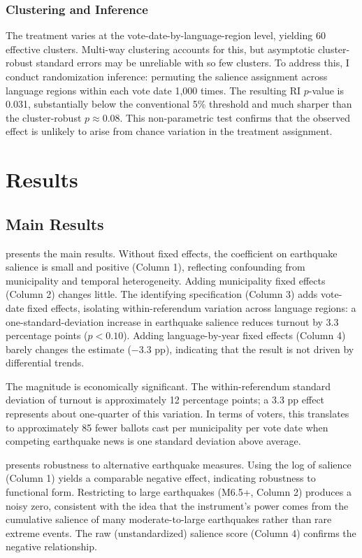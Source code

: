 \documentclass[12pt]{article}
\begin{document}
\subsubsection*{Clustering and Inference} The treatment varies at the vote-date-by-language-region level, yielding 60 effective clusters. Multi-way clustering accounts for this, but asymptotic cluster-robust standard errors may be unreliable with so few clusters. To address this, I conduct randomization inference: permuting the salience assignment across language regions within each vote date 1,000 times. The resulting RI $p$-value is 0.031, substantially below the conventional 5\% threshold and much sharper than the cluster-robust $p \approx 0.08$. This non-parametric test confirms that the observed effect is unlikely to arise from chance variation in the treatment assignment.

\section{Results}

\subsection{Main Results}

 presents the main results. Without fixed effects, the coefficient on earthquake salience is small and positive (Column 1), reflecting confounding from municipality and temporal heterogeneity. Adding municipality fixed effects (Column 2) changes little. The identifying specification (Column 3) adds vote-date fixed effects, isolating within-referendum variation across language regions: a one-standard-deviation increase in earthquake salience reduces turnout by 3.3 percentage points ($p < 0.10$). Adding language-by-year fixed effects (Column 4) barely changes the estimate ($-3.3$ pp), indicating that the result is not driven by differential trends.

The magnitude is economically significant. The within-referendum standard deviation of turnout is approximately 12 percentage points; a 3.3 pp effect represents about one-quarter of this variation. In terms of voters, this translates to approximately 85 fewer ballots cast per municipality per vote date when competing earthquake news is one standard deviation above average.

{\small}

 presents robustness to alternative earthquake measures. Using the log of salience (Column 1) yields a comparable negative effect, indicating robustness to functional form. Restricting to large earthquakes (M6.5+, Column 2) produces a noisy zero, consistent with the idea that the instrument's power comes from the cumulative salience of many moderate-to-large earthquakes rather than rare extreme events. The raw (unstandardized) salience score (Column 4) confirms the negative relationship.
\end{document}
